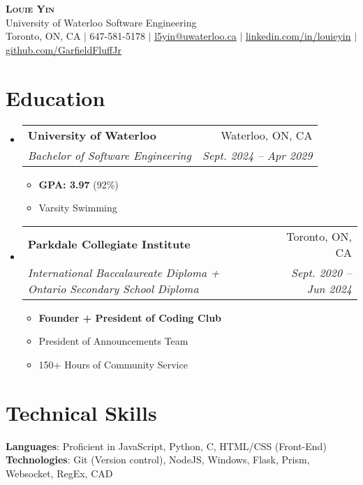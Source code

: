 \documentclass[letterpaper,11pt]{article}
\makeatletter
\newcommand{\resumeItem}[1]{
  \item\small{
    {#1 \vspace{-2pt}}
  }
}
\newcommand{\resumeSubheading}[4]{
  \vspace{-2pt}\item
    \begin{tabular*}{0.97\textwidth}[t]{l@{\extracolsep{\fill}}r}
      \textbf{#1} & #2 \\
      \textit{\small#3} & \textit{\small #4} \\
    \end{tabular*}\vspace{-7pt}
}
\newcommand{\resumeSubHeadingListStart}{\begin{itemize}[leftmargin=0.15in, label={}]}
\newcommand{\resumeSubHeadingListEnd}{\end{itemize}}
\newcommand{\resumeItemListStart}{\begin{itemize}}
\newcommand{\resumeItemListEnd}{\end{itemize}\vspace{-8pt}}
\makeatother
\begin{document}

\begin{center}
    \textbf{\Huge \scshape Louie Yin} \\
    \Large University of Waterloo Software Engineering \\ \vspace{3pt}
    \small Toronto, ON, CA $|$
    \small 647-581-5178 $|$ \href{mailto:l5yin@uwaterloo.ca}{\underline{l5yin@uwaterloo.ca}} $|$ 
    \href{https://www.linkedin.com/in/louieyin/}{\underline{linkedin.com/in/louieyin}} $|$
    \href{https://github.com/GarfieldFluffJr}{\underline{github.com/GarfieldFluffJr}}
\end{center}


\section{Education}
  \resumeSubHeadingListStart
    \resumeSubheading
      {University of Waterloo}{Waterloo, ON, CA}
      {Bachelor of Software Engineering}{Sept. 2024 -- Apr 2029}
      \resumeItemListStart
        \resumeItem{\textbf{GPA: 3.97} (92\%)}
        \resumeItem{Varsity Swimming}
      \resumeItemListEnd
    \resumeSubheading
      {Parkdale Collegiate Institute}{Toronto, ON, CA}
      {International Baccalaureate Diploma + Ontario Secondary School Diploma}{Sept. 2020 -- Jun 2024}
    \resumeItemListStart
      \resumeItem{\textbf{Founder + President of Coding Club}}
      \resumeItem{President of Announcements Team}
      \resumeItem{150+ Hours of Community Service}
    \resumeItemListEnd
  \resumeSubHeadingListEnd


\section{Technical Skills}
 \begin{itemize}[leftmargin=0.15in, label={}]
    \small{\item{
     \textbf{Languages}{: Proficient in JavaScript, Python, C, HTML/CSS (Front-End)} \\
     \textbf{Technologies}{: Git (Version control), NodeJS, Windows, Flask, Prism, Websocket, RegEx, CAD} \\
    }}
 \end{itemize}
\end{document}
